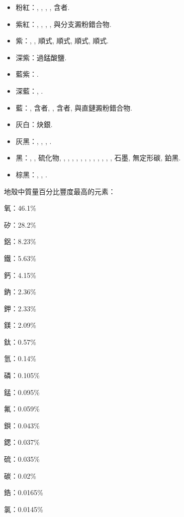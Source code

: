 \documentclass[a4paper,12pt]{report}
\begin{document}
\begin{itemize}
\item 粉紅：\ce{[Co(H2O)2Cl2]}, , , , 含者.
\item 紫紅：, \ce{[Cr(H2O)2Cl2]}, , , 與分支澱粉錯合物.
\item 紫：, , 順式\ce{[Cr(NH3)3Cl3]}, 順式, 順式\ce{[Co(NH3)3Cl3]}, 順式.
\item 深紫：過錳酸鹽.
\item 藍紫：.
\item 深藍：, .
\item 藍：, 含者, \ce{[Cr(H2O)4Cl2]}, 含者, 與直鏈澱粉錯合物.
\item 灰白：炔銀.
\item 灰黑：, , , .
\item 黑：, , 硫化物, , , , , , , , , , , , , 石墨, 無定形碳, 鉑黑.
\item 棕黑：, , .
\end{itemize}
地殼中質量百分比豐度最高的元素： 
\ben
\item 氧：46.1\%
\item 矽：28.2\%
\item 鋁：8.23\%
\item 鐵：5.63\%
\item 鈣：4.15\%
\item 鈉：2.36\%
\item 鉀：2.33\%
\item 鎂：2.09\%
\item 鈦：0.57\%
\item 氫：0.14\%
\item 磷：0.105\%
\item 錳：0.095\%
\item 氟：0.059\%
\item 鋇：0.043\%
\item 鍶：0.037\%
\item 硫：0.035\%
\item 碳：0.02\%
\item 鋯：0.0165\%
\item 氯：0.0145\%
\een
\end{document}

